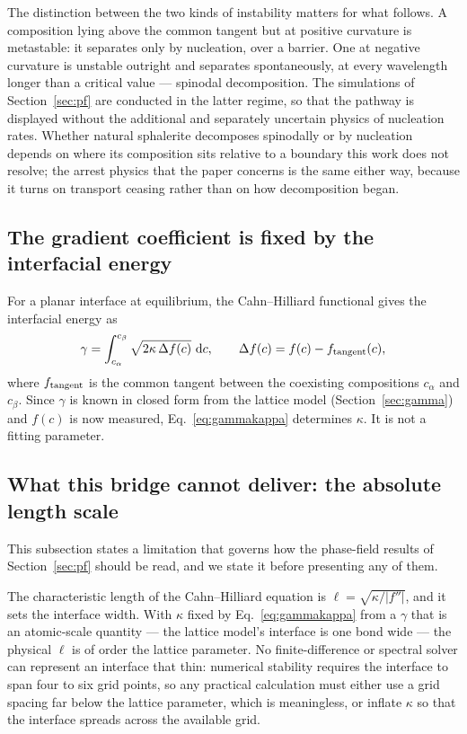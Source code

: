 \documentclass[11pt,a4paper]{article}
\begin{document}
The distinction between the two kinds of instability matters for what follows.
A composition lying above the common tangent but at positive curvature is
metastable: it separates only by nucleation, over a barrier. One at negative
curvature is unstable outright and separates spontaneously, at every wavelength
longer than a critical value --- spinodal decomposition. The simulations of
Section~\ref{sec:pf} are conducted in the latter regime, so that the pathway is
displayed without the additional and separately uncertain physics of nucleation
rates. Whether natural sphalerite decomposes spinodally or by nucleation depends
on where its composition sits relative to a boundary this work does not resolve;
the arrest physics that the paper concerns is the same either way, because it
turns on transport ceasing rather than on how decomposition began.

\subsection{The gradient coefficient is fixed by the interfacial energy}
\label{sec:kappa}

For a planar interface at equilibrium, the Cahn--Hilliard functional gives the
interfacial energy as
\begin{equation}
\gamma = \int_{c_\alpha}^{c_\beta} \sqrt{2\kappa\, \Delta f(c)}\ \mathrm{d}c,
\qquad
\Delta f(c) = f(c) - f_{\rm tangent}(c),
\label{eq:gammakappa}
\end{equation}
where $f_{\rm tangent}$ is the common tangent between the coexisting
compositions $c_\alpha$ and $c_\beta$. Since $\gamma$ is known in closed form
from the lattice model (Section~\ref{sec:gamma}) and $f(c)$ is now measured,
Eq.~\eqref{eq:gammakappa} determines $\kappa$. It is not a fitting parameter.

\subsection{What this bridge cannot deliver: the absolute length scale}
\label{sec:kappacaveat}

This subsection states a limitation that governs how the phase-field results of
Section~\ref{sec:pf} should be read, and we state it before presenting any of
them.

The characteristic length of the Cahn--Hilliard equation is
$\ell = \sqrt{\kappa / |f''|}$, and it sets the interface width. With $\kappa$
fixed by Eq.~\eqref{eq:gammakappa} from a $\gamma$ that is an atomic-scale
quantity --- the lattice model's interface is one bond wide --- the physical
$\ell$ is of order the lattice parameter. No finite-difference or spectral
solver can represent an interface that thin: numerical stability requires the
interface to span four to six grid points, so any practical calculation must
either use a grid spacing far below the lattice parameter, which is
meaningless, or inflate $\kappa$ so that the interface spreads across the
available grid.
\end{document}

